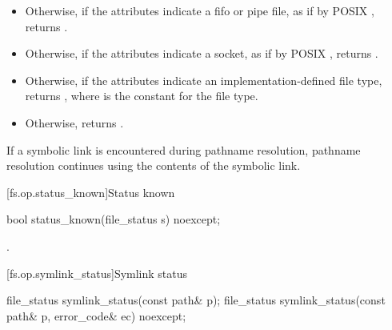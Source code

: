 \begin{itemdescr}
\begin{itemize}
\begin{itemize}
      by POSIX , returns .
\item Otherwise, if the attributes indicate a fifo or pipe file, as if by
      POSIX , returns .
\item Otherwise, if the attributes indicate a socket, as if by POSIX
      , returns .
\item Otherwise, if the attributes indicate an implementation-defined
      file type,
      returns ,
      where  is the constant for the
       file type.
\item Otherwise, returns .
\end{itemize}
\end{itemize}

\pnum
\remarks If a symbolic link is encountered during pathname resolution,
      pathname resolution continues using the contents of the symbolic link.
\end{itemdescr}


[fs.op.status_known]{Status known}

%
\begin{itemdecl}
bool status_known(file_status s) noexcept;
\end{itemdecl}

\begin{itemdescr}
\pnum
\returns {}.
\end{itemdescr}


[fs.op.symlink_status]{Symlink status}

%
\begin{itemdecl}
file_status symlink_status(const path& p);
file_status symlink_status(const path& p, error_code& ec) noexcept;
\end{itemdecl}

